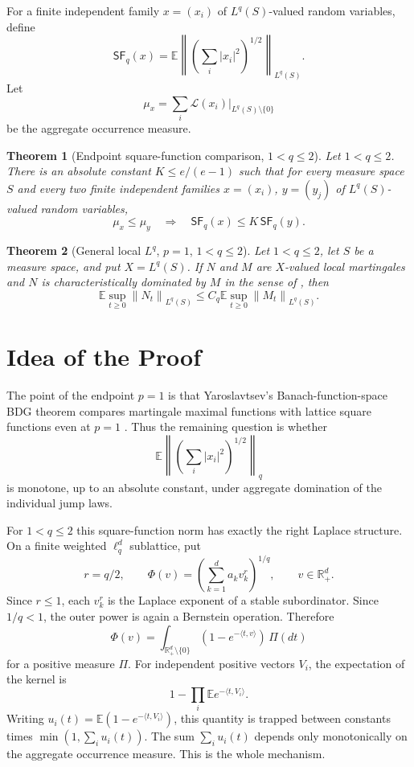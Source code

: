 \documentclass[11pt]{article}
\newtheorem{theorem}{Theorem}
\newcommand{\E}{\mathbb E}
\newcommand{\R}{\mathbb R}
\newcommand{\norm}[1]{\left\lVert #1\right\rVert}
\newcommand{\Lq}{L^q(S)}
\newcommand{\sfq}{\mathsf{SF}_q}
\begin{document}
For a finite independent family \(x=(x_i)\) of \(L^q(S)\)-valued random
variables, define
\[
  \sfq(x)
  =
  \E\left\|
      \left(\sum_i |x_i|^2\right)^{1/2}
    \right\|_{L^q(S)}.
\]
Let
\[
   \mu_x=\sum_i \mathcal L(x_i)|_{\Lq\setminus\{0\}}
\]
be the aggregate occurrence measure.

\begin{theorem}[Endpoint square-function comparison, \(1<q\le2\)]
\label{thm:square}
Let \(1<q\le2\).  There is an absolute constant \(K\le e/(e-1)\) such that
for every measure space \(S\) and every two finite independent families
\(x=(x_i)\), \(y=(y_j)\) of \(L^q(S)\)-valued random variables,
\[
  \mu_x\le \mu_y
  \quad\Longrightarrow\quad
  \sfq(x)\le K\,\sfq(y).
\]
\end{theorem}

\begin{theorem}[General local \(L^q\), \(p=1\), \(1<q\le2\)]
\label{thm:main}
Let \(1<q\le2\), let \(S\) be a measure space, and put \(X=L^q(S)\).  If
\(N\) and \(M\) are \(X\)-valued local martingales and \(N\) is
characteristically dominated by \(M\) in the sense of
\cite[Definition 12.9]{Yaroslavtsev2019}, then
\[
  \E\sup_{t\ge0}\norm{N_t}_{L^q(S)}
  \le
  C_q
  \E\sup_{t\ge0}\norm{M_t}_{L^q(S)}.
\]
\end{theorem}

\section*{Idea of the Proof}

The point of the endpoint \(p=1\) is that Yaroslavtsev's Banach-function-space
BDG theorem compares martingale maximal functions with lattice square
functions even at \(p=1\) \cite{Yaroslavtsev2018}.  Thus the remaining
question is whether
\[
  \E\left\|\left(\sum_i |x_i|^2\right)^{1/2}\right\|_q
\]
is monotone, up to an absolute constant, under aggregate domination of the
individual jump laws.

For \(1<q\le2\) this square-function norm has exactly the right Laplace
structure.  On a finite weighted \(\ell_q^d\) sublattice, put
\[
  r=q/2,\qquad
  \Phi(v)=\left(\sum_{k=1}^d a_k v_k^r\right)^{1/q},
  \qquad v\in\R_+^d.
\]
Since \(r\le1\), each \(v_k^r\) is the Laplace exponent of a stable
subordinator.  Since \(1/q<1\), the outer power is again a Bernstein
operation.  Therefore
\[
  \Phi(v)=\int_{\R_+^d\setminus\{0\}}
           \left(1-e^{-\langle t,v\rangle}\right)\,\Pi(dt)
\]
for a positive measure \(\Pi\).  For independent positive vectors \(V_i\),
the expectation of the kernel is
\[
  1-\prod_i \E e^{-\langle t,V_i\rangle}.
\]
Writing \(u_i(t)=\E(1-e^{-\langle t,V_i\rangle})\), this quantity is trapped
between constants times \(\min(1,\sum_i u_i(t))\).  The sum
\(\sum_i u_i(t)\) depends only monotonically on the aggregate occurrence
measure.  This is the whole mechanism.
\end{document}
